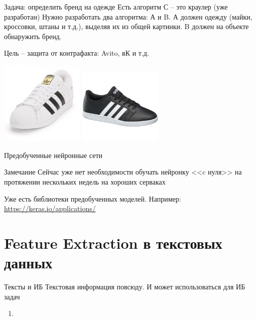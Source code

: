 \begin{frame}{Задача: определить бренд на одежде}
	\small
	Есть алгоритм С -- это краулер (уже разработан)
	Нужно разработать два алгоритма: А и B.
	А должен одежду (майки, кроссовки, штаны и т.д.),
	выделяя их из общей картинки. B должен на объекте обнаружить бренд.
	
	Цель -- защита от контрафакта: Avito, вК и т.д.
	
	\includegraphics[width=4cm]{../pic/adidas1.png}
	\includegraphics[width=4cm]{../pic/adidas2.png}
	
	
\end{frame}

\begin{frame}{Предобученные нейронные сети}
	
	\begin{block}{Замечание}
	Сейчас уже нет необходимости обучать нейронку <<c нуля>>
	на протяжении нескольких недель на хороших серваках
	
	Уже есть библиотеки предобученных моделей. 
	Например: \url{https://keras.io/applications/}
	\end{block}
\end{frame}


\section{Feature Extraction в текстовых данных}\label{section:texts_fe}


\begin{frame}{Тексты и ИБ}
	Текстовая информация повсюду. 
	И может использоваться для ИБ задач
	\begin{enumerate}
		\item {}
	\end{enumerate}
\end{frame}


